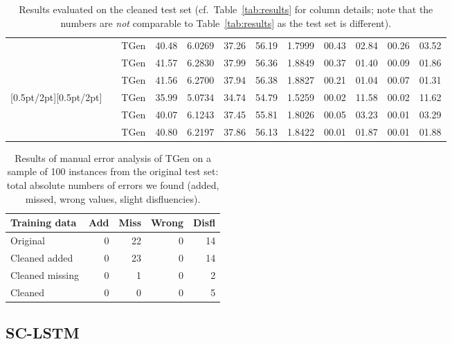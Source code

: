 \documentclass[11pt,a4paper]{article}
\newcommand\Tstrut{\rule{0pt}{2.3ex}}       \newcommand\Bstrut{\rule[-1.5ex]{0pt}{0pt}}
\begin{document}
\begin{table*}[tb]
\begin{tabular}{lcl|ccccc|cccc}
 & & TGen  & 40.48 & 6.0269 & 37.26 & 56.19 & 1.7999 & 00.43 & 02.84 & 00.26 & 03.52\Tstrut  \\ &   & TGen     & 41.57 & 6.2830 & 37.99 & 56.36 & 1.8849 & 00.37 & 01.40 & 00.09 & 01.86  \\ &   & TGen  & 41.56 & 6.2700 & 37.94 & 56.38 & 1.8827 & 00.21 & 01.04 & 00.07 & 01.31  \\[0.5pt/2pt][0.5pt/2pt]   & & TGen  & 35.99 & 5.0734 & 34.74 & 54.79 & 1.5259 & 00.02 & 11.58 & 00.02 & 11.62\Tstrut  \\ &   & TGen     & 40.07 & 6.1243 & 37.45 & 55.81 & 1.8026 & 00.05 & 03.23 & 00.01 & 03.29  \\ &   & TGen  & 40.80 & 6.2197 & 37.86 & 56.13 & 1.8422 & 00.01 & 01.87 & 00.01 & 01.88  \\\hline \end{tabular}
\caption{Results evaluated on the cleaned test set (cf.~Table~\ref{tab:results} for column details; note that the numbers are \emph{not} comparable to Table~\ref{tab:results} as the test set is different).
}
\label{tab:results-clean-testset}
\end{table*}


\begin{table}[tb]
\vspace{-2mm}
\footnotesize\centering
\begin{tabular}{lrrrr}\hline
\bf Training data & \bf Add & \bf Miss & \bf Wrong & \bf Disfl  \\\hline
Original        & 0 & 22 & 0 & 14\Tstrut \\
Cleaned added   & 0 & 23 & 0 & 14 \\
Cleaned missing & 0 &  1 & 0 &  2 \\
Cleaned         & 0 &  0 & 0 &  5 \\\hline
\end{tabular}
\caption{Results of manual error analysis of TGen on a sample of 100 instances from the original test set: total absolute numbers of errors we found (added, missed, wrong values, slight disfluencies).}
\label{tab:manual-results}
\vspace{-3mm}
\end{table}

\subsection{SC-LSTM}
\label{sec:sclstm}
\end{document}
